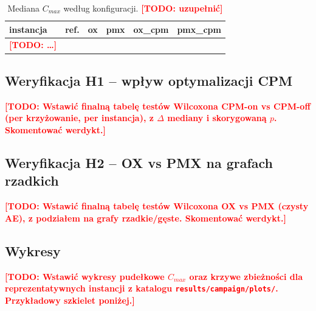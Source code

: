 \documentclass[12pt,a4paper]{article}
\newcommand{\todo}[1]{\textcolor{red}{\textbf{[TODO: #1]}}}
\begin{document}
\begin{table}[h]
\centering
\small
\begin{tabular}{lrrrrr}
\toprule
instancja & ref. & ox & pmx & ox\_cpm & pmx\_cpm \\
\midrule
\todo{\dots} & & & & & \\
\bottomrule
\end{tabular}
\caption{Mediana $C_{max}$ według konfiguracji. \todo{uzupełnić}}
\label{tab:cmax}
\end{table}

\subsection{Weryfikacja H1 -- wpływ optymalizacji CPM}
\todo{Wstawić finalną tabelę testów Wilcoxona CPM-on vs CPM-off (per krzyżowanie, per instancja), z $\Delta$ mediany i skorygowaną $p$. Skomentować werdykt.}

\subsection{Weryfikacja H2 -- OX vs PMX na grafach rzadkich}
\todo{Wstawić finalną tabelę testów Wilcoxona OX vs PMX (czysty AE), z podziałem na grafy rzadkie/gęste. Skomentować werdykt.}

\subsection{Wykresy}
\todo{Wstawić wykresy pudełkowe $C_{max}$ oraz krzywe zbieżności dla reprezentatywnych instancji z katalogu \texttt{results/campaign/plots/}. Przykładowy szkielet poniżej.}


\end{document}
